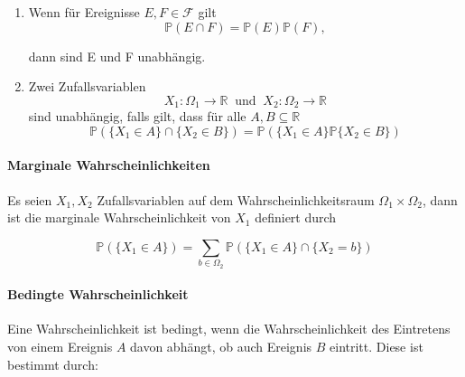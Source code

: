 \begin{Def}

\vspace{5pt}

\begin{enumerate}
	\item Wenn f\"ur Ereignisse $E, F \in \mathcal{F} $ gilt
	\begin{equation} 
	\mathbb{P} (E\cap F)= \mathbb{P} (E)  \mathbb{P} (F),
	\end{equation}

dann sind E und F unabh\"angig. 

\item Zwei Zufallsvariablen 
\begin{equation*}
X_{1}: \Omega_{1} \rightarrow \mathbb{R} \: \text{ und } \: X_{2}: \Omega_{2} \rightarrow \mathbb{R}
\end{equation*}
sind unabh\"angig, falls gilt, dass f\"ur alle $A, B \subseteq \mathbb{R}$
\begin{equation*}
\mathbb{P} (\{X_{1} \in A\} \cap \{X_{2} \in B\} ) = \mathbb{P} (\{X_{1} \in A\}  \mathbb{P} \{X_{2} \in B\} )
\end{equation*}
\end{enumerate}
\end{Def}
\vspace{10pt}

\paragraph {Marginale Wahrscheinlichkeiten}

Es seien $X_{1}, X_{2}$ Zufallsvariablen auf dem Wahrscheinlichkeitsraum $\Omega_{1}\times \Omega_{2}$, dann ist die marginale Wahrscheinlichkeit von $X_{1}$ definiert durch 

\begin{equation*}
\mathbb{P} (\{X_{1} \in A \} ) = \sum_{b \in \Omega_{2} } \mathbb{P} (\{X_{1} \in A\} \cap \{X_{2} = b\})
\end{equation*}

\vspace{10pt}

\paragraph {Bedingte Wahrscheinlichkeit}
Eine Wahrscheinlichkeit ist bedingt, wenn die Wahrscheinlichkeit des Eintretens von einem Ereignis $A$ davon abhängt, ob auch Ereignis $B$ eintritt. 
Diese ist bestimmt durch:

